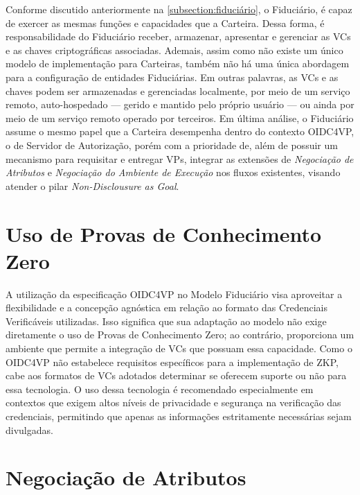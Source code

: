 Conforme discutido anteriormente na \autoref{subsection:fiduciário}, o Fiduciário, é capaz de exercer as mesmas funções e capacidades que a Carteira. Dessa forma, é responsabilidade do Fiduciário receber, armazenar, apresentar e gerenciar as \acs{VC}s e as chaves criptográficas associadas. Ademais, assim como não existe um único modelo de implementação para Carteiras, também não há uma única abordagem para a configuração de entidades Fiduciárias. Em outras palavras, as \acs{VC}s e as chaves podem ser armazenadas e gerenciadas localmente, por meio de um serviço remoto, auto-hospedado — gerido e mantido pelo próprio usuário — ou ainda por meio de um serviço remoto operado por terceiros. 
Em última análise, o Fiduciário assume o mesmo papel que a Carteira desempenha dentro do contexto \acs{OIDC4VP}, o de Servidor de Autorização, porém com a prioridade de, além de possuir um mecanismo para requisitar e entregar VPs, integrar as extensões de \emph{Negociação de Atributos} e \emph{Negociação do Ambiente de Execução} nos fluxos existentes, visando atender o pilar \emph{Non-Disclousure as Goal}.



\section{Uso de Provas de Conhecimento Zero}

A utilização da especificação OIDC4VP no Modelo Fiduciário visa aproveitar a flexibilidade e a concepção agnóstica em relação ao formato das Credenciais Verificáveis utilizadas. Isso significa que sua adaptação ao modelo não exige diretamente o uso de Provas de Conhecimento Zero; ao contrário, proporciona um ambiente que permite a integração de \acs{VC}s que possuam essa capacidade. Como o \acs{OIDC4VP} não estabelece requisitos específicos para a implementação de \acs{ZKP}, cabe aos formatos de \acs{VC}s adotados determinar se oferecem suporte ou não para essa tecnologia. O uso dessa tecnologia é recomendado especialmente em contextos que exigem altos níveis de privacidade e segurança na verificação das credenciais, permitindo que apenas as informações estritamente necessárias sejam divulgadas.

\section{Negociação de Atributos}\label{section:attribute-negotiation}

